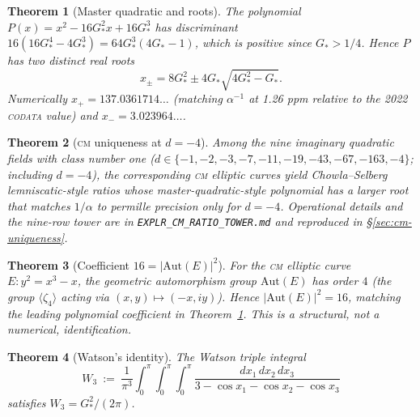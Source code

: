 \documentclass[11pt,reqno]{amsart}
\theoremstyle{plain}
\newtheorem{theorem}{Theorem}[section]
\theoremstyle{definition}
\theoremstyle{remark}
\numberwithin{equation}{section}
\newcommand{\Gstar}{G_{\!*}}
\begin{document}
\begin{theorem}[Master quadratic and roots]
\label{thm:masterq}
The polynomial $P(x) = x^{2} - 16\Gstar^{2}x + 16\Gstar^{3}$ has
discriminant $16(16\Gstar^{4} - 4\Gstar^{3}) = 64\Gstar^{3}(4\Gstar - 1)$,
which is positive since $\Gstar > 1/4$. Hence $P$ has two distinct
real roots
\[
  x_{\pm} = 8\Gstar^{2} \pm 4\Gstar\sqrt{4\Gstar^{2} - \Gstar}.
\]
Numerically $x_{+} = 137.0361714\ldots$ (matching $\alpha^{-1}$ at
1.26 ppm relative to the 2022 \textsc{codata} value) and
$x_{-} = 3.023964\ldots$.
\end{theorem}

\begin{theorem}[\textsc{cm} uniqueness at $d = -4$]
\label{thm:cm-uniqueness}
Among the nine imaginary quadratic fields with class number one
($d \in \{-1, -2, -3, -7, -11, -19, -43, -67, -163, -4\}$;
including $d=-4$), the corresponding \textsc{cm} elliptic curves
yield Chowla--Selberg lemniscatic-style ratios whose
master-quadratic-style polynomial has a larger root that matches
$1/\alpha$ to permille precision \emph{only} for $d = -4$.
Operational details and the nine-row tower are in
\texttt{EXPLR\_CM\_RATIO\_TOWER.md} and reproduced in \S\ref{sec:cm-uniqueness}.
\end{theorem}

\begin{theorem}[Coefficient $16 = |\mathrm{Aut}(E)|^{2}$]
\label{thm:aut-sq}
For the \textsc{cm} elliptic curve $E\colon y^{2} = x^{3} - x$,
the geometric automorphism group $\mathrm{Aut}(E)$ has order $4$
(the group $\langle \zeta_{4} \rangle$ acting via
$(x, y) \mapsto (-x, iy)$). Hence $|\mathrm{Aut}(E)|^{2} = 16$,
matching the leading polynomial coefficient in
Theorem~\ref{thm:masterq}. \emph{This is a structural, not a
numerical, identification.}
\end{theorem}

\begin{theorem}[Watson's identity]
\label{thm:watson}
The Watson triple integral
\[
  W_{3}\ :=\ \frac{1}{\pi^{3}}\int_{0}^{\pi}\!\int_{0}^{\pi}\!
    \int_{0}^{\pi}
    \frac{dx_{1}\,dx_{2}\,dx_{3}}
         {3 - \cos x_{1} - \cos x_{2} - \cos x_{3}}
\]
satisfies $W_{3} = \Gstar^{2}/(2\pi)$.
\end{theorem}
\end{document}
